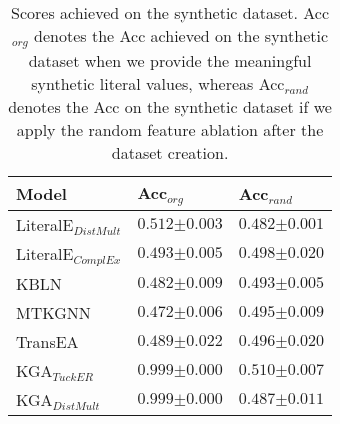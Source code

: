 
\begin{table}[]

\setlength{\tabcolsep}{6pt}
\renewcommand{\arraystretch}{1.1}

\caption{Scores achieved on the synthetic dataset. Acc$_{org}$ denotes the Acc achieved on the synthetic dataset when we provide the meaningful synthetic literal values, whereas Acc$_{rand}$ denotes the Acc on the synthetic dataset if we apply the random feature ablation after the dataset creation.}
\label{tab:synthetic}
\begin{center}

\begin{tabular}{l|l|l}
\hline
Model & Acc$_{org}$                            &  Acc$_{rand}$                            \\ \hline
LiteralE$_{DistMult}$ & $0.512 {\scriptstyle \pm 0.003}$ & $0.482 {\scriptstyle \pm 0.001}$\\ 
LiteralE$_{ComplEx}$ & $0.493 {\scriptstyle \pm 0.005}$ & $0.498 {\scriptstyle \pm 0.020}$\\ 
KBLN & $0.482 {\scriptstyle \pm 0.009}$ & $0.493 {\scriptstyle \pm 0.005}$\\ 
MTKGNN & $0.472 {\scriptstyle \pm 0.006}$ & $0.495 {\scriptstyle \pm 0.009}$\\ 
TransEA & $0.489 {\scriptstyle \pm 0.022}$ & $0.496 {\scriptstyle \pm 0.020}$\\ 
KGA$_{TuckER}$ & $0.999 {\scriptstyle \pm 0.000}$ & $0.510 {\scriptstyle \pm 0.007}$\\ 
KGA$_{DistMult}$ & $0.999 {\scriptstyle \pm 0.000}$ & $0.487 {\scriptstyle \pm 0.011}$\\ 

\hline
\end{tabular}

\end{center}
\end{table}
